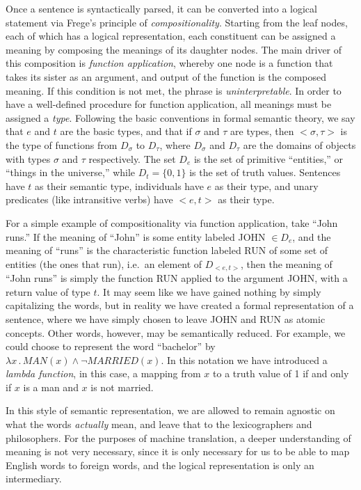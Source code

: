 \documentclass[11pt, oneside]{article}      %
\begin{document}
Once a sentence is syntactically parsed, it can be converted into a logical statement via Frege's principle of \textit{compositionality}.  Starting from the leaf nodes, each of which has a logical representation, each constituent can be assigned a meaning by composing the meanings of its daughter nodes.  The main driver of this composition is \textit{function application}, whereby one node is a function that takes its sister as an argument, and output of the function is the composed meaning.  If this condition is not met, the phrase is \textit{uninterpretable}.  In order to have a well-defined procedure for function application, all meanings must be assigned a \textit{type}.  Following the basic conventions in formal semantic theory, we say that $e$ and $t$ are the basic types, and that if $\sigma$ and $\tau$ are types, then ${<}\sigma, \tau{>}$ is the type of functions from $D_{\sigma}$ to $D_{\tau}$, where $D_{\sigma}$ and $D_{\tau}$ are the domains of objects with types $\sigma$ and $\tau$ respectively.  The set $D_e$ is the set of primitive ``entities,'' or ``things in the universe,'' while $D_t = \{0, 1\}$ is the set of truth values.  Sentences have $t$ as their semantic type, individuals have $e$ as their type, and unary predicates (like intransitive verbs) have ${<}e, t{>}$ as their type.

For a simple example of compositionality via function application, take ``John runs.'' If the meaning of ``John'' is some entity labeled JOHN $\in D_e$, and the meaning of ``runs'' is the characteristic function labeled RUN of some set of entities (the ones that run), i.e.\ an element of $D_{<e, t>}$, then the meaning of ``John runs'' is simply the function RUN applied to the argument JOHN, with a return value of type $t$.  It may seem like we have gained nothing by simply capitalizing the words, but in reality we have created a formal representation of a sentence, where we have simply chosen to leave JOHN and RUN as atomic concepts.  Other words, however, may be semantically reduced.  For example, we could choose to represent the word ``bachelor'' by $\lambda x \, . \, MAN(x) \wedge \neg MARRIED(x).$  In this notation we have introduced a \textit{lambda function}, in this case, a mapping from $x$ to a truth value of 1 if and only if $x$ is a man and $x$ is not married.  

In this style of semantic representation, we are allowed to remain agnostic on what the words \textit{actually} mean, and leave that to the lexicographers and philosophers.  For the purposes of machine translation, a deeper understanding of meaning is not very necessary, since it is only necessary for us to be able to map English words to foreign words, and the logical representation is only an intermediary.
\end{document}
